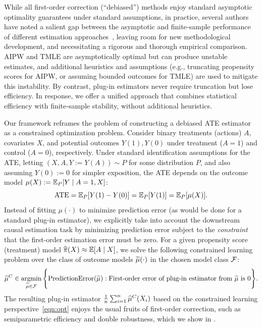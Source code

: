 While all first-order correction (``debiased'') methods enjoy standard asymptotic optimality guarantees under standard assumptions, in practice, several authors have noted a salient gap between the asymptotic and
finite-sample performance of different estimation approaches~\citep{KangSc07, CarvalhoFeMuWoYe19}, leaving room for 
new methodological development, and necessitating a rigorous and thorough empirical comparison. %
AIPW and TMLE are asymptotically optimal but can produce unstable estimates, and additional heuristics and assumptions (e.g., truncating propensity scores for AIPW, or assuming bounded outcomes for TMLE) are used to mitigate this instability. 
By contrast, plug-in estimators never require truncation but lose efficiency. In response, we offer a unified approach that combines statistical efficiency with finite‐sample stability, without additional heuristics. 


Our framework reframes the problem of constructing a debiased ATE estimator as a constrained optimization problem.  Consider binary treatments (actions) $A$, covariates $X$, and potential outcomes $Y(1), Y(0)$ under treatment ($A=1$) and control ($A=0$), respectively. Under standard identification assumptions for the ATE, letting $(X,A,Y:=Y(A))\sim P$ for some distribution $P$, and also assuming $Y(0) := 0$ for simpler exposition, the ATE
depends on the outcome model $\mu(X):=\mathbb{E}_P[Y\mid A=1,X]$:
\begin{equation*}
    \mbox{ATE} = \E_{P}[Y(1) - Y(0)] = \E_{P}[Y(1)]
    = \E_P[\mu(X)]%
    .
\end{equation*}
Instead of fitting $\mu(\cdot)$ to minimize prediction error (as would be done for a standard plug-in estimator), we explicitly take into account the downstream causal estimation task
by minimizing prediction error subject to the \emph{constraint} that the first-order estimation error must be zero. For a given propensity score (treatment) model $\widehat{\pi}(X) \approx \mathbb{E}[A \mid X]$,
we solve the following constrained learning problem over the class of outcome models $\widetilde{\mu}(\cdot)$ in the chosen model class $\mathcal{F}$:
\begin{equation}
    \label{eqn:opt}
    \widehat{\mu}^C \in  \mathop{\rm argmin}_{\widetilde{\mu} \in \mathcal{F}} \Bigg\{ \mbox{PredictionError}(\widetilde{\mu}):
            \mbox{First-order error of plug-in estimator from }\widetilde{\mu} \text{ is } 0
        \Bigg\}
.\end{equation}
The resulting plug-in estimator $\frac{1}{n}\sum_{i=1}^n \widehat{\mu}^C(X_i)$ based on the constrained learning perspective~\eqref{eqn:opt} enjoys the usual fruits of first-order correction, such as semiparametric efficiency and double robustness, which we show in .

